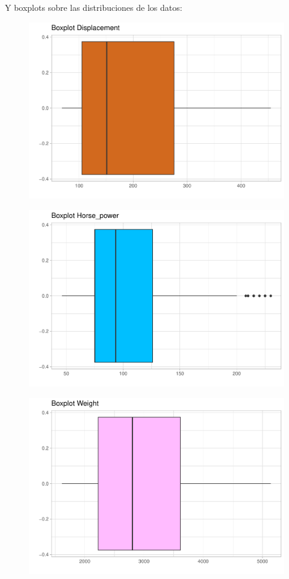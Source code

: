 Y boxplots sobre las distribuciones de los datos:
\begin{figure}[H]\includegraphics[width=.9\linewidth]{img/EDA_files/figure-latex/unnamed-chunk-8-1} \caption{}\end{figure}
\begin{figure}[H]\includegraphics[width=.9\linewidth]{img/EDA_files/figure-latex/unnamed-chunk-8-2} \caption{}\end{figure}
\begin{figure}[H]\includegraphics[width=.9\linewidth]{img/EDA_files/figure-latex/unnamed-chunk-8-3} \caption{}\end{figure}
